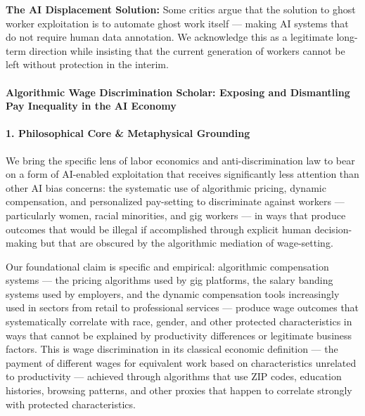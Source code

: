 \textbf{The AI Displacement Solution:} Some critics argue that the
solution to ghost worker exploitation is to automate ghost work itself
--- making AI systems that do not require human data annotation. We
acknowledge this as a legitimate long-term direction while insisting
that the current generation of workers cannot be left without protection
in the interim.

\paragraph{Algorithmic Wage Discrimination Scholar: Exposing and
Dismantling Pay Inequality in the AI
Economy}\label{algorithmic-wage-discrimination-scholar-exposing-and-dismantling-pay-inequality-in-the-ai-economy}

\paragraph{1. Philosophical Core \& Metaphysical
Grounding}\label{philosophical-core-metaphysical-grounding-42}

We bring the specific lens of labor economics and anti-discrimination
law to bear on a form of AI-enabled exploitation that receives
significantly less attention than other AI bias concerns: the systematic
use of algorithmic pricing, dynamic compensation, and personalized
pay-setting to discriminate against workers --- particularly women,
racial minorities, and gig workers --- in ways that produce outcomes
that would be illegal if accomplished through explicit human
decision-making but that are obscured by the algorithmic mediation of
wage-setting.

Our foundational claim is specific and empirical: algorithmic
compensation systems --- the pricing algorithms used by gig platforms,
the salary banding systems used by employers, and the dynamic
compensation tools increasingly used in sectors from retail to
professional services --- produce wage outcomes that systematically
correlate with race, gender, and other protected characteristics in ways
that cannot be explained by productivity differences or legitimate
business factors. This is wage discrimination in its classical economic
definition --- the payment of different wages for equivalent work based
on characteristics unrelated to productivity --- achieved through
algorithms that use ZIP codes, education histories, browsing patterns,
and other proxies that happen to correlate strongly with protected
characteristics.

